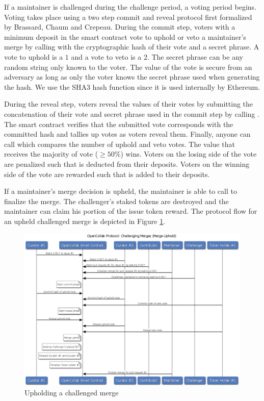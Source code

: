 If a maintainer is challenged during the challenge period, a voting
period begins. Voting takes place using a two step commit and reveal protocol
first formalized by Brassard, Chaum and Crepeau\cite{proofsofknowledge}. During
the commit step, voters with a minimum  deposit in the
smart contract vote to uphold or veto a maintainer's merge by calling
 with the cryptographic hash of their vote and a secret
phrase. A vote to uphold is a $1$ and a vote to veto is a $2$. The secret phrase
can be any random string only known to the voter. The value of the vote is
secure from an adversary as long as only the voter knows the secret phrase used
when generating the hash. We use the SHA3  hash function
since it is used internally by Ethereum.

During the reveal step, voters reveal the values of their votes by submitting
the concatenation of their vote and secret phrase used in the commit step by
calling . The smart contract verifies that the
submitted vote corresponds with the committed hash and tallies up votes as
voters reveal them. Finally, anyone can call  which
compares the number of uphold and veto votes. The value that receives the
majority of vote ($\geq 50\%$) wins. Voters on the losing side of the vote are
penalized such that  is deducted from their
deposits. Voters on the winning side of the vote are rewarded such that
 is added to their deposits.

If a maintainer's merge decision is upheld, the maintainer is able to call
 to finalize the merge. The challenger's
 staked tokens are destroyed and the maintainer can
claim his portion of the issue token reward. The protocol flow for an upheld
challenged merge is depicted in Figure \ref{fig:challengedUpheld}.

\begin{figure}[]
  \centering
  \includegraphics[width=\linewidth,keepaspectratio]{figures/OpenCollab-Protocol-Challenging-Merges-Upheld.png}
  \caption{Upholding a challenged merge}
  \label{fig:challengedUpheld}
\end{figure}

